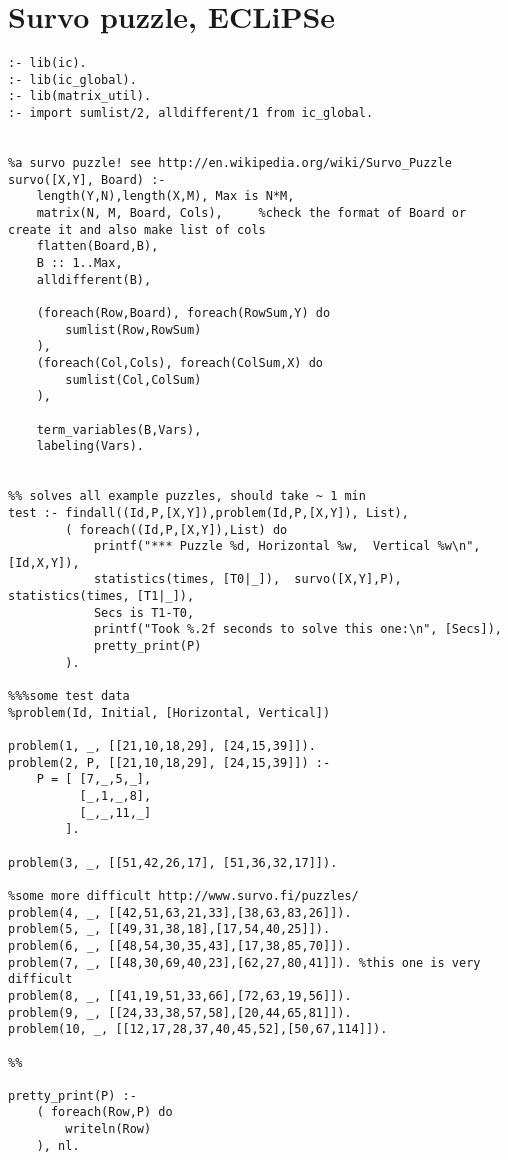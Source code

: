 \documentclass[a4paper,11pt,english]{article}
\begin{document}
\clearpage

\makeatletter
\def\url@leostyle{%
  \@ifundefined{selectfont}{\def\UrlFont{\sf}}{\def\UrlFont{\footnotesize\ttfamily}}}
\makeatother


\clearpage

\appendix
\section{Survo puzzle, ECLiPSe\label{survofullprogram}}
\begin{lstlisting}
:- lib(ic).
:- lib(ic_global).
:- lib(matrix_util).
:- import sumlist/2, alldifferent/1 from ic_global.


%a survo puzzle! see http://en.wikipedia.org/wiki/Survo_Puzzle
survo([X,Y], Board) :-
	length(Y,N),length(X,M), Max is N*M,
	matrix(N, M, Board, Cols),     %check the format of Board or create it and also make list of cols
	flatten(Board,B),
	B :: 1..Max, 
	alldifferent(B),
	
	(foreach(Row,Board), foreach(RowSum,Y) do
		sumlist(Row,RowSum)
	),
	(foreach(Col,Cols), foreach(ColSum,X) do
		sumlist(Col,ColSum)
	),
	
	term_variables(B,Vars),
	labeling(Vars).


%% solves all example puzzles, should take ~ 1 min
test :- findall((Id,P,[X,Y]),problem(Id,P,[X,Y]), List),
		( foreach((Id,P,[X,Y]),List) do
			printf("*** Puzzle %d, Horizontal %w,  Vertical %w\n",[Id,X,Y]),
			statistics(times, [T0|_]),	survo([X,Y],P),	statistics(times, [T1|_]),
    		Secs is T1-T0,
    		printf("Took %.2f seconds to solve this one:\n", [Secs]),
			pretty_print(P)
		).
		
%%%some test data
%problem(Id, Initial, [Horizontal, Vertical])

problem(1, _, [[21,10,18,29], [24,15,39]]).
problem(2, P, [[21,10,18,29], [24,15,39]]) :-
	P = [ [7,_,5,_],
		  [_,1,_,8],
		  [_,_,11,_]
		].

problem(3, _, [[51,42,26,17], [51,36,32,17]]).

%some more difficult http://www.survo.fi/puzzles/
problem(4, _, [[42,51,63,21,33],[38,63,83,26]]).
problem(5, _, [[49,31,38,18],[17,54,40,25]]).
problem(6, _, [[48,54,30,35,43],[17,38,85,70]]).
problem(7, _, [[48,30,69,40,23],[62,27,80,41]]). %this one is very difficult
problem(8, _, [[41,19,51,33,66],[72,63,19,56]]).
problem(9, _, [[24,33,38,57,58],[20,44,65,81]]).
problem(10, _, [[12,17,28,37,40,45,52],[50,67,114]]).

%%

pretty_print(P) :-
	( foreach(Row,P) do
		writeln(Row)
	), nl.
\end{lstlisting}
\end{document}
